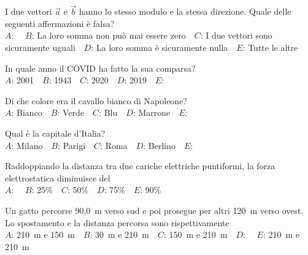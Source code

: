 \mcquestionfooter



\def\mcquestionnumber{3}


\mcquestionheader I due vettori $\vec{a}$ e $\vec{b}$ hanno lo stesso modulo e la stessa direzione. Quale delle seguenti affermazioni è falsa?\\
{$A$}: \ \ {$B$}: La loro somma non può mai essere zero\ \ {$C$}: I due vettori sono sicuramente uguali\ \ {$D$}: La loro somma è sicuramente nulla\ \ {$E$}: Tutte le altre\ \ 

\mcquestionfooter



\def\mcquestionnumber{4}


\mcquestionheader In quale anno il COVID ha fatto la sua comparsa?\\
{$A$}: 2001\ \ {$B$}: 1943\ \ {$C$}: 2020\ \ {$D$}: 2019\ \ {$E$}: \ \ 

\mcquestionfooter



\def\mcquestionnumber{5}


\mcquestionheader Di che colore era il cavallo bianco di Napoleone?\\
{$A$}: Bianco\ \ {$B$}: Verde\ \ {$C$}: Blu\ \ {$D$}: Marrone\ \ {$E$}: \ \ 

\mcquestionfooter



\def\mcquestionnumber{6}


\mcquestionheader Qual è la capitale d’Italia?\\
{$A$}: Milano\ \ {$B$}: Parigi\ \ {$C$}: Roma\ \ {$D$}: Berlino\ \ {$E$}: \ \ 

\mcquestionfooter



\def\mcquestionnumber{7}


\mcquestionheader Raddoppiando la distanza tra due cariche elettriche puntiformi, la forza elettrostatica diminuisce del\\
{$A$}: \ \ {$B$}: 25\%\ \ {$C$}: 50\%\ \ {$D$}: 75\%\ \ {$E$}: 90\%\ \ 

\mcquestionfooter



\def\mcquestionnumber{8}


\mcquestionheader Un gatto percorre 90,0~m verso sud e poi prosegue per altri 120~m verso ovest. Lo spostamento e la distanza percorsa sono rispettivamente\\
{$A$}: 210~m e 150~m\ \ {$B$}: 30~m e 210~m\ \ {$C$}: 150~m e 210~m\ \ {$D$}: \ \ {$E$}: 210~m e 210~m\ \ 


